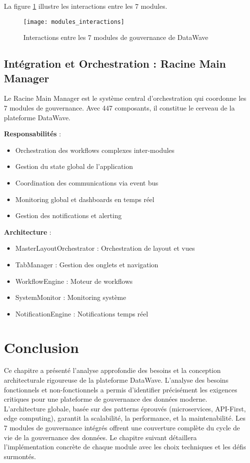 La figure \ref{fig:modules_interactions} illustre les interactions entre les 7 modules.

\begin{figure}[htpb]
\centering
\texttt{[image: modules\_interactions]}
\caption{Interactions entre les 7 modules de gouvernance de DataWave}
\label{fig:modules_interactions}
\end{figure}

\subsection{Intégration et Orchestration : Racine Main Manager}

Le Racine Main Manager est le système central d'orchestration qui coordonne les 7 modules de gouvernance. Avec 447 composants, il constitue le cerveau de la plateforme DataWave.

\textbf{Responsabilités} :
\begin{itemize}
    \item Orchestration des workflows complexes inter-modules
    \item Gestion du state global de l'application
    \item Coordination des communications via event bus
    \item Monitoring global et dashboards en temps réel
    \item Gestion des notifications et alerting
\end{itemize}

\textbf{Architecture} :
\begin{itemize}
    \item MasterLayoutOrchestrator : Orchestration de layout et vues
    \item TabManager : Gestion des onglets et navigation
    \item WorkflowEngine : Moteur de workflows
    \item SystemMonitor : Monitoring système
    \item NotificationEngine : Notifications temps réel
\end{itemize}

\section*{Conclusion}

Ce chapitre a présenté l'analyse approfondie des besoins et la conception architecturale rigoureuse de la plateforme DataWave. L'analyse des besoins fonctionnels et non-fonctionnels a permis d'identifier précisément les exigences critiques pour une plateforme de gouvernance des données moderne. L'architecture globale, basée sur des patterns éprouvés (microservices, API-First, edge computing), garantit la scalabilité, la performance, et la maintenabilité. Les 7 modules de gouvernance intégrés offrent une couverture complète du cycle de vie de la gouvernance des données. Le chapitre suivant détaillera l'implémentation concrète de chaque module avec les choix techniques et les défis surmontés.
